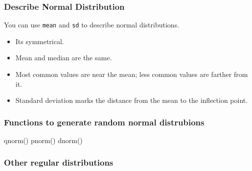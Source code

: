 \documentclass[
]{article}
\newenvironment{Shaded}{}{}
\newcommand{\FunctionTok}[1]{\textcolor[rgb]{0.02,0.16,0.49}{#1}}
\newcommand{\NormalTok}[1]{#1}
\begin{document}
\hypertarget{describe-normal-distribution}{%
\subsubsection{Describe Normal
Distribution}\label{describe-normal-distribution}}

You can use \texttt{mean} and \texttt{sd} to describe normal
distributions.

\begin{itemize}
\item
  It\textquotesingle s symmetrical.
\item
  Mean and median are the same.
\item
  Most common values are near the mean; less common values are farther
  from it.
\item
  Standard deviation marks the distance from the mean to the inflection
  point.
\end{itemize}

\hypertarget{functions-to-generate-random-normal-distrubions}{%
\subsubsection{Functions to generate random normal
distrubions}\label{functions-to-generate-random-normal-distrubions}}

\begin{Shaded}
\begin{Highlighting}[]
\FunctionTok{qnorm}\NormalTok{()}
\FunctionTok{pnorm}\NormalTok{()}
\FunctionTok{dnorm}\NormalTok{()}
\end{Highlighting}
\end{Shaded}

\hypertarget{other-regular-distributions}{%
\subsubsection{Other regular
distributions}\label{other-regular-distributions}}
\end{document}
